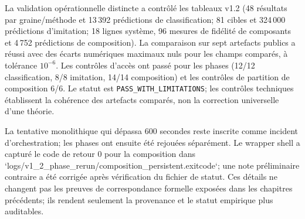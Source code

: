 \documentclass[11pt,a4paper,oneside]{report}
\begin{document}
La validation opérationnelle distincte a contrôlé les tableaux v1.2 (48 résultats par graine/méthode et 13\,392 prédictions de classification; 81 cibles et 324\,000 prédictions d'imitation; 18 lignes système, 96 mesures de fidélité de composants et 4\,752 prédictions de composition). La comparaison sur sept artefacts publics a réussi avec des écarts numériques maximaux nuls pour les champs comparés, à tolérance \(10^{-6}\). Les contrôles d'accès ont passé pour les phases (12/12 classification, 8/8 imitation, 14/14 composition) et les contrôles de partition de composition 6/6. Le statut est \texttt{PASS\_WITH\_LIMITATIONS}; les contrôles techniques établissent la cohérence des artefacts comparés, non la correction universelle d'une théorie.

La tentative monolithique qui dépassa 600 secondes reste inscrite comme incident d'orchestration; les phases ont ensuite été rejouées séparément. Le wrapper shell a capturé le code de retour 0 pour la composition dans `logs/v1\_2\_phase\_rerun/composition\_persistent.exitcode`; une note préliminaire contraire a été corrigée après vérification du fichier de statut. Ces détails ne changent pas les preuves de correspondance formelle exposées dans les chapitres précédents; ils rendent seulement la provenance et le statut empirique plus auditables.
\end{document}
